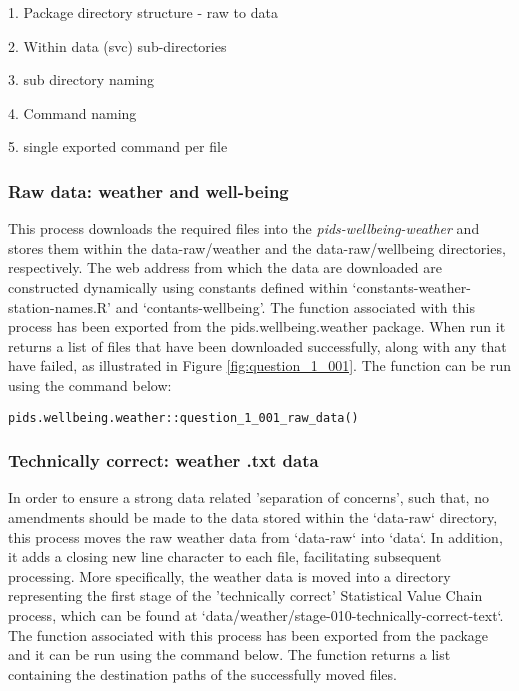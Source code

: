 \documentclass[12pt, oneside, openany]{book}
\begin{document}
1. Package directory structure - raw to data

2. Within data (svc) sub-directories

3. sub directory naming

4. Command naming

5. single exported command per file

\subsubsection*{Raw data: weather and well-being}

This process downloads the required files into the \emph{pids-wellbeing-weather} and stores them within the data-raw/weather and the data-raw/wellbeing directories, respectively. The web address from which the data are downloaded are constructed dynamically using constants defined within `constants-weather-station-names.R' and `contants-wellbeing'. The function associated with this process has been exported from the pids.wellbeing.weather package. When run it returns a list of files that have been downloaded successfully, along with any that have failed, as illustrated in Figure \ref{fig:question_1_001}. The function can be run using the command below:

\begin{verbatim}
pids.wellbeing.weather::question_1_001_raw_data()
\end{verbatim}

\subsubsection*{Technically correct: weather .txt data}

In order to ensure a strong data related 'separation of concerns', such that, no amendments should be made to the data stored within the `data-raw` directory, this process moves the raw weather data from `data-raw` into `data`. In addition, it adds a closing new line character to each file, facilitating subsequent processing. More specifically, the weather data is moved into a directory representing the first stage of the 'technically correct' Statistical Value Chain process, which can be found at `data/weather/stage-010-technically-correct-text`. The function associated with this process has been exported from the package and it can be run using the command below. The function returns a list containing the destination paths of the successfully moved files.
\end{document}
